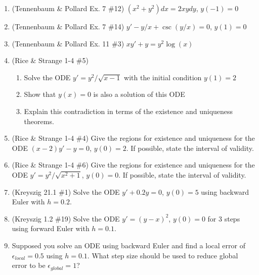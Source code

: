 \documentclass[letterpaper, fontsize=12pt]{scrartcl} %
\numberwithin{equation}{section} %
\numberwithin{figure}{section} %
\numberwithin{table}{section} %
\begin{document}
\begin{enumerate}
\item (Tennenbaum \& Pollard Ex. 7 \#12) $(x^2 + y^2)dx = 2xydy$, $y(-1) = 0$

\item (Tennenbaum \& Pollard Ex. 7 \#14) $y' - y/x + \csc(y/x) = 0$, $y(1) = 0$

\item (Tennenbaum \& Pollard Ex. 11 \#3) $xy' + y = y^2 \log(x)$

\item (Rice \& Strange 1-4 \#5) 
\begin{enumerate}[label=(\alph*)]
\item Solve the ODE $y' = y^2 / \sqrt{x-1}$ with the initial condition $y(1) = 2$
\item Show that $y(x) = 0$ is also a solution of this ODE
\item Explain this contradiction in terms of the existence and uniqueness theorems.
\end{enumerate}

\item (Rice \& Strange 1-4 \#4) Give the regions for existence and uniqueness for the ODE $(x-2)y' - y = 0$, $y(0) = 2$. If possible, state the interval of validity. 

\item (Rice \& Strange 1-4 \#6) Give the regions for existence and uniqueness for the ODE $y' = y^2 /\sqrt{x^2 + 1}$, $y(0) = 0$. If possible, state the interval of validity. 

\item (Kreyszig 21.1 \#1) Solve the ODE $y' + 0.2y = 0$, $y(0)=5$ using backward Euler with $h=0.2$. 

\item (Kreyszig 1.2 \#19) Solve the ODE $y' = (y- x)^2$, $y(0) = 0$ for 3 steps using forward Euler with $h = 0.1$. 

\item Supposed you solve an ODE using backward Euler and find a local error of $\epsilon_{local} = 0.5$ using $h = 0.1$. What step size should be used to reduce global error to be $\epsilon_{global} = 1$?


\end{enumerate}

\end{document}

